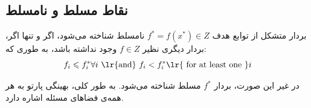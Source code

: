 \subsection{نقاط مسلط و نامسلط}
بردار متشکل از توابع هدف 
$f^*=f(x^*) \in Z$
نامسلط شناخته می‌شود، اگر و تنها اگر، بردار دیگری نظیر 
$f\in Z$
وجود نداشته باشد، به طوری که:
\begin{equation}
	f_i \leq f_i^* \forall i \textrm{  \lr{and}  } f_i < f_i^* \text{\lr{  for at least one }} i
\end{equation}

در غیر این صورت، بردار 
$f^*$
مسلط شناخته می‌شود. به طور کلی، بهینگی پارتو به هر همه‌ی فضاهای مسئله اشاره دارد.